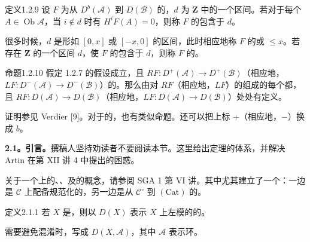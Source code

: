 \begin{SGAresult}{定义}{1.2.9}
设 $F$ 为从 $D^b(\mathcal A)$ 到 $D(\mathcal B)$ 的，$d$ 为 $\mathbf Z$ 中的一个区间。若对于每个 $A\in\operatorname{Ob}\mathcal A$，当 $i\notin d$ 时有 $H^iF(A)=0$，则称 $F$ 的包含于 $d$。
\end{SGAresult}
很多时候，$d$ 是形如 $[0,x]$ 或 $[-x,0]$ 的区间，此时相应地称 $F$ 的或 $\le x$。若存在 $\mathbf Z$ 的一个区间 $d$，使 $F$ 的包含于 $d$，则称 $F$ 的。

\begin{SGAresult}{命题}{1.2.10}
假定 1.2.7 的假设成立，且 $RF:D^+(\mathcal A)\to D^+(\mathcal B)$（相应地，$LF:D^-(\mathcal A)\to D^-(\mathcal B)$）的。那么由对 $RF$（相应地，$LF$）的组成的每个都，且 $RF:D(\mathcal A)\to D(\mathcal B)$（相应地，$LF:D(\mathcal A)\to D(\mathcal B)$）处处有定义。
\end{SGAresult}
证明参见 Verdier [9]。对于的，也有类似命题。还可以把上标 $+$（相应地，$-$）换成 $b$。

\textbf{2.1。引言。}撰稿人坚持劝读者不要阅读本节。这里给出定理的体系，并解决 Artin 在第 XII 讲 4 中提出的困惑。

关于一个上的、、及的概念，请参阅 SGA 1 第 VI 讲。其中尤其建立了一个：一边是 $\mathcal C$ 上配备规范化的，另一边是从 $\mathcal C^\circ$ 到 $(\mathrm{Cat})$ 的。

\begin{SGAresult}{定义}{2.1.1}
若 $X$ 是，则以 $D(X)$ 表示 $X$ 上左模的的。
\end{SGAresult}
需要避免混淆时，写成 $D(X,\mathcal A)$，其中 $\mathcal A$ 表示环。

